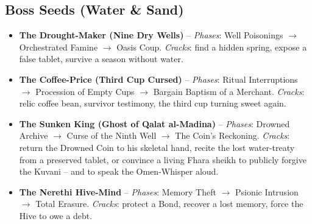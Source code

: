\subsection*{Boss Seeds (Water \& Sand)}
\begin{itemize}
\item \textbf{The Drought-Maker (Nine Dry Wells)} -- \emph{Phases}: Well Poisonings \(\rightarrow\) Orchestrated Famine \(\rightarrow\) Oasis Coup. \emph{Cracks}: find a hidden spring, expose a false tablet, survive a season without water.
\item \textbf{The Coffee-Price (Third Cup Cursed)} -- \emph{Phases}: Ritual Interruptions \(\rightarrow\) Procession of Empty Cups \(\rightarrow\) Bargain Baptism of a Merchant. \emph{Cracks}: relic coffee bean, survivor testimony, the third cup turning sweet again.
\item \textbf{The Sunken King (Ghost of Qalat al-Madina)} -- \emph{Phases}: Drowned Archive \(\rightarrow\) Curse of the Ninth Well \(\rightarrow\) The Coin's Reckoning. \emph{Cracks}: return the Drowned Coin to his skeletal hand, recite the lost water-treaty from a preserved tablet, or convince a living Fhara sheikh to publicly forgive the Kuvani -- and to speak the Omen-Whisper aloud.
\item \textbf{The Nerethi Hive-Mind} -- \emph{Phases}: Memory Theft \(\rightarrow\) Psionic Intrusion \(\rightarrow\) Total Erasure. \emph{Cracks}: protect a Bond, recover a lost memory, force the Hive to owe a debt.
\end{itemize}

